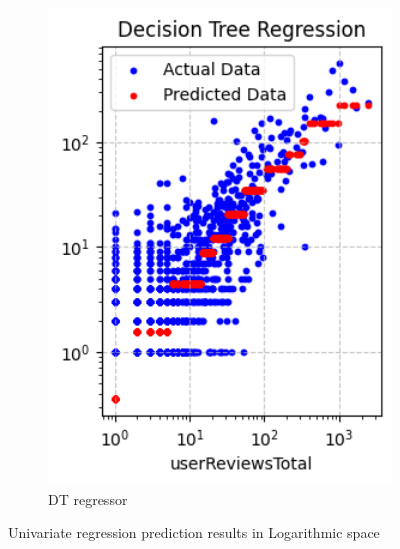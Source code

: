 \begin{figure}[H]
\begin{subfigure}{0.24\textwidth}
        \includegraphics[width=1\textwidth]{plots/dt_regressor.png}
        \caption{DT regressor}
        \captionsetup{width=0.9\linewidth, justification=centering}
        \label{fig:elastic}
    \end{subfigure}
    \caption{Univariate regression prediction results in Logarithmic space}
    \label{fig:univariate_regression}
\end{figure}

